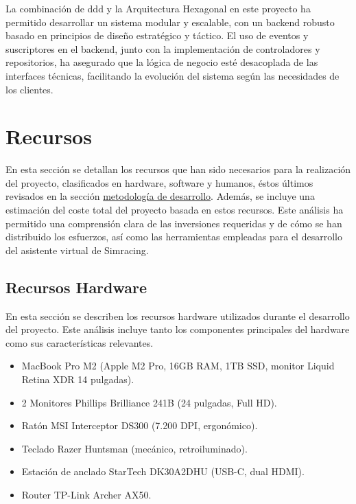 La combinación de \ac{ddd} y la Arquitectura Hexagonal en este proyecto ha permitido desarrollar un sistema modular y escalable, con un backend robusto basado en principios de diseño estratégico y táctico. El uso de eventos y suscriptores en el backend, junto con la implementación de controladores y repositorios, ha asegurado que la lógica de negocio esté desacoplada de las interfaces técnicas, facilitando la evolución del sistema según las necesidades de los clientes.

\section{Recursos}
En esta sección se detallan los recursos que han sido necesarios para la realización del proyecto, clasificados en hardware, software y humanos, éstos últimos revisados en la sección \hyperref[sec:impl_xp]{metodología de desarrollo}. Además, se incluye una estimación del coste total del proyecto basada en estos recursos. Este análisis ha permitido una comprensión clara de las inversiones requeridas y de cómo se han distribuido los esfuerzos, así como las herramientas empleadas para el desarrollo del asistente virtual de Simracing.

\subsection{Recursos Hardware}
En esta sección se describen los recursos hardware utilizados durante  el desarrollo del proyecto. Este análisis incluye tanto los componentes principales del hardware como sus características relevantes.

\begin{itemize}
\item MacBook Pro M2 (Apple M2 Pro, 16GB RAM, 1TB SSD, monitor Liquid Retina XDR 14 pulgadas).
\item 2 Monitores Phillips Brilliance 241B (24 pulgadas, Full HD).
\item Ratón MSI Interceptor DS300 (7.200 DPI, ergonómico).
\item Teclado Razer Huntsman (mecánico, retroiluminado).
\item Estación de anclado StarTech DK30A2DHU (USB-C, dual HDMI).
\item Router TP-Link Archer AX50.
\end{itemize}

